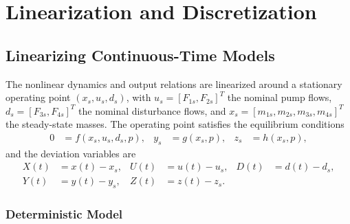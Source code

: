 \chapter{Linearization and Discretization}

\section{Linearizing Continuous-Time Models}
\label{sec:5_1}

The nonlinear dynamics and output relations are linearized around a stationary
operating point $(x_s, u_s, d_s)$, with $u_s = [F_{1s}, F_{2s}]^T$ the nominal
pump flows, $d_s = [F_{3s}, F_{4s}]^T$ the nominal disturbance flows, and
$x_s = [m_{1s}, m_{2s}, m_{3s}, m_{4s}]^T$ the steady-state masses. The
operating point satisfies the equilibrium conditions
\begin{align}
    0 &= f(x_s, u_s, d_s, p), & y_s &= g(x_s, p), & z_s &= h(x_s, p),
\end{align}
and the deviation variables are
\begin{align}
    X(t) &= x(t) - x_s, & U(t) &= u(t) - u_s, & D(t) &= d(t) - d_s, \\
    Y(t) &= y(t) - y_s, & Z(t) &= z(t) - z_s.
\end{align}

\subsection{Deterministic Model}

